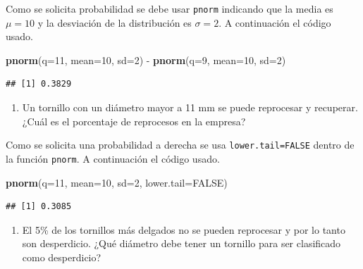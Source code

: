 \documentclass[10pt,]{krantz}
\makeatletter
\newenvironment{Shaded}{\begin{snugshade}}{\end{snugshade}}
\newcommand{\KeywordTok}[1]{\textcolor[rgb]{0.13,0.29,0.53}{\textbf{{#1}}}}
\newcommand{\DataTypeTok}[1]{\textcolor[rgb]{0.13,0.29,0.53}{{#1}}}
\newcommand{\DecValTok}[1]{\textcolor[rgb]{0.00,0.00,0.81}{{#1}}}
\newcommand{\StringTok}[1]{\textcolor[rgb]{0.31,0.60,0.02}{{#1}}}
\newcommand{\OtherTok}[1]{\textcolor[rgb]{0.56,0.35,0.01}{{#1}}}
\newcommand{\NormalTok}[1]{{#1}}
\providecommand{\tightlist}{%
  \setlength{\itemsep}{0pt}\setlength{\parskip}{0pt}}
\newenvironment{kframe}{%
\medskip{}
\setlength{\fboxsep}{.8em}
 \def\at@end@of@kframe{}%
 \ifinner\ifhmode%
  \def\at@end@of@kframe{\end{minipage}}%
  \begin{minipage}{\columnwidth}%
 \fi\fi%
 \def\FrameCommand##1{\hskip\@totalleftmargin \hskip-\fboxsep
 \colorbox{shadecolor}{##1}\hskip-\fboxsep
     \hskip-\linewidth \hskip-\@totalleftmargin \hskip\columnwidth}%
 \MakeFramed {\advance\hsize-\width
   \@totalleftmargin\z@ \linewidth\hsize
   \@setminipage}}%
 {\par\unskip\endMakeFramed%
 \at@end@of@kframe}
\renewenvironment{Shaded}{\begin{kframe}}{\end{kframe}}
\makeatother
\begin{document}
Como se solicita probabilidad se debe usar \texttt{pnorm} indicando que
la media es \(\mu=10\) y la desviación de la distribución es
\(\sigma=2\). A continuación el código usado.

\begin{Shaded}
\begin{Highlighting}[]
\KeywordTok{pnorm}\NormalTok{(}\DataTypeTok{q=}\DecValTok{11}\NormalTok{, }\DataTypeTok{mean=}\DecValTok{10}\NormalTok{, }\DataTypeTok{sd=}\DecValTok{2}\NormalTok{) -}\StringTok{ }\KeywordTok{pnorm}\NormalTok{(}\DataTypeTok{q=}\DecValTok{9}\NormalTok{, }\DataTypeTok{mean=}\DecValTok{10}\NormalTok{, }\DataTypeTok{sd=}\DecValTok{2}\NormalTok{)}
\end{Highlighting}
\end{Shaded}

\begin{verbatim}
## [1] 0.3829
\end{verbatim}

\begin{enumerate}
\def\labelenumi{\arabic{enumi})}
\setcounter{enumi}{1}
\tightlist
\item
  Un tornillo con un diámetro mayor a 11 mm se puede reprocesar y
  recuperar. ¿Cuál es el porcentaje de reprocesos en la empresa?
\end{enumerate}

Como se solicita una probabilidad a derecha se usa
\texttt{lower.tail=FALSE} dentro de la función \texttt{pnorm}. A
continuación el código usado.

\begin{Shaded}
\begin{Highlighting}[]
\KeywordTok{pnorm}\NormalTok{(}\DataTypeTok{q=}\DecValTok{11}\NormalTok{, }\DataTypeTok{mean=}\DecValTok{10}\NormalTok{, }\DataTypeTok{sd=}\DecValTok{2}\NormalTok{, }\DataTypeTok{lower.tail=}\OtherTok{FALSE}\NormalTok{)}
\end{Highlighting}
\end{Shaded}

\begin{verbatim}
## [1] 0.3085
\end{verbatim}

\begin{enumerate}
\def\labelenumi{\arabic{enumi})}
\setcounter{enumi}{2}
\tightlist
\item
  El 5\% de los tornillos más delgados no se pueden reprocesar y por lo
  tanto son desperdicio. ¿Qué diámetro debe tener un tornillo para ser
  clasificado como desperdicio?
\end{enumerate}
\end{document}
